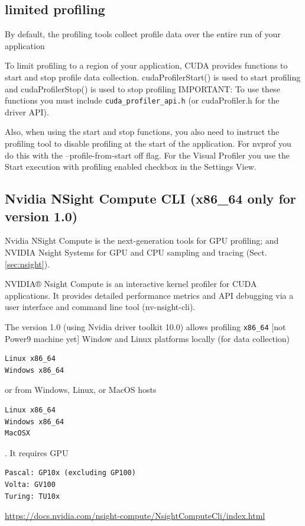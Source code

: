 \subsection{limited profiling}

By default, the profiling tools collect profile data over the entire run of your application

To limit profiling to a region of your application, CUDA provides functions to
start and stop profile data collection. cudaProfilerStart() is used to start
profiling and cudaProfilerStop() is used to stop profiling IMPORTANT: To use
these functions you must include \verb!cuda_profiler_api.h! (or cudaProfiler.h
for the driver API).

Also, when using the start and stop functions, you also need to instruct the
profiling tool to disable profiling at the start of the application. For nvprof
you do this with the --profile-from-start off flag. For the Visual Profiler you
use the Start execution with profiling enabled checkbox in the Settings View.


\subsection{Nvidia NSight Compute CLI (x86\_64 only for version 1.0)}
\label{sec:nsight-compute}

Nvidia NSight Compute is the next-generation tools for GPU profiling; and NVIDIA
Nsight Systems for GPU and CPU sampling and tracing (Sect.\ref{sec:nsight}).


NVIDIA® Nsight Compute is an interactive kernel profiler for CUDA applications.
It provides detailed performance metrics and API debugging via a user interface
and command line tool (nv-nsight-cli).

The version 1.0 (using Nvidia driver toolkit 10.0) allows profiling
\verb!x86_64! [not Power9 machine yet] Window and Linux platforms locally (for data collection)
\begin{verbatim}
Linux x86_64
Windows x86_64
\end{verbatim}
or
from Windows, Linux, or MacOS hosts
\begin{verbatim}
Linux x86_64
Windows x86_64
MacOSX
\end{verbatim}
. It requires GPU
\begin{verbatim}
Pascal: GP10x (excluding GP100)
Volta: GV100
Turing: TU10x
\end{verbatim}

\url{https://docs.nvidia.com/nsight-compute/NsightComputeCli/index.html}


